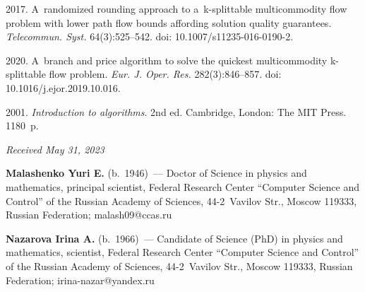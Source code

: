 \begin{multicols}{2}
{{\begin{thebibliography}{99}
 2017. A~randomized rounding approach to a~k-splittable multicommodity flow problem 
with lower path flow bounds affording solution quality guarantees.
 \textit{Telecommun. Syst.} 64(3):525--542. doi: 10.1007/s11235-016-0190-2.
   
2020. A~branch and price algorithm to solve the quickest multicommodity \mbox{k-splittable} flow problem. 
\textit{Eur. J. Oper. Res.} 282(3):846--857. doi: 10.1016/j.ejor.2019.10.016.
    
 2001. \textit{Introduction to algorithms}. 2nd ed. Cambridge, London: The MIT Press.  1180~p.
\end{thebibliography}

 }
 }

\end{multicols}

\vspace*{-9pt}

\hfill{\small\textit{Received May 31, 2023}} 

\vspace*{-22pt}
  


\Contr

\vspace*{-4pt}

\noindent
\textbf{Malashenko Yuri E.} (b.\ 1946)~--- 
Doctor of Science in physics and mathematics, principal scientist, Federal Research Center ``Computer Science and Control'' 
of the Russian Academy of Sciences, 44-2~Vavilov Str., Moscow 119333, Russian Federation; \mbox{malash09@ccas.ru} 


\noindent
\textbf{Nazarova Irina A.} (b.\ 1966)~--- Candidate of Science (PhD) in physics and mathematics, scientist, 
Federal Research Center ``Computer Science and Control'' of the Russian Academy of Sciences, 44-2~Vavilov Str., Moscow 119333, Russian Federation; 
\mbox{irina-nazar@yandex.ru}


\label{end\stat}

\renewcommand{\bibname}{\protect\rm Литература} 